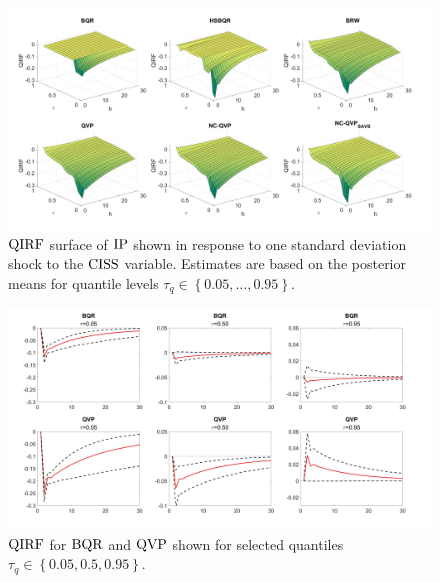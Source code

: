 
\begin{figure}
    \centering
    \includegraphics[width=\linewidth]{Figures/QIRF.jpg}
    \caption{$\operatorname{QIRF}$ surface of $\operatorname{IP}$ shown in response to one standard deviation shock to the $\operatorname{CISS}$ variable. Estimates are  based on the posterior means for quantile levels $\tau_q \in \left\{0.05,\dotsc,0.95\right\}$.}
    \label{fig:QIRF}
\end{figure}

\begin{figure}
    \centering
    \includegraphics[width=\linewidth]{Figures/QIRF_QuantSpec.jpg}
    \caption{$\operatorname{QIRF}$ for $\operatorname{BQR}$ and $\operatorname{QVP}$ shown for selected quantiles $\tau_q \in \left\{0.05, 0.5, 0.95 \right\}$.}
    \label{fig:QIRFQuantSpec}
\end{figure}

